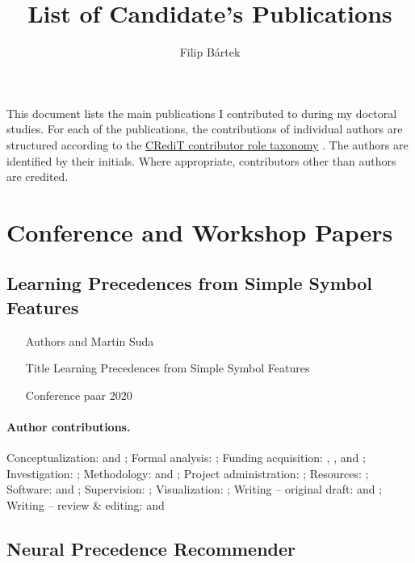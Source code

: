 \documentclass{article}
\title{List of Candidate's Publications}
\author{Filip Bártek}
\begin{document}


\maketitle

This document lists the main publications I contributed to during my doctoral studies.
For each of the publications,
the contributions of individual authors are structured according to the \href{https://credit.niso.org/}{CRediT contributor role taxonomy} \cite{DBLP:journals/lp/BrandAAHS15}.
The authors are identified by their initials.
Where appropriate, contributors other than authors are credited.

\section{Conference and Workshop Papers}

\subsection{Learning Precedences from Simple Symbol Features \cite{DBLP:conf/cade/Bartek020}}

\begin{itemize}
\item[Authors]  and Martin Suda
\item[Title] Learning Precedences from Simple Symbol Features
\item[Conference] \Acrfull{paar} 2020
\end{itemize}

\paragraph{Author contributions.}
Conceptualization:            \MS{} and \FB{};
Formal analysis:              \FB{};
Funding acquisition:          \JU{}, \MS{}, and \FB{};
Investigation:                \FB{};
Methodology:                  \MS{} and \FB{};
Project administration:       \MS{};
Resources:                    \JU{};
Software:                     \FB{} and \MS{};
Supervision:                  \MS{};
Visualization:                \FB{};
Writing -- original draft:    \FB{} and \MS{};
Writing -- review \& editing: \FB{} and \MS{}

\subsection{Neural Precedence Recommender \cite{DBLP:conf/cade/Bartek021}}
\end{document}

